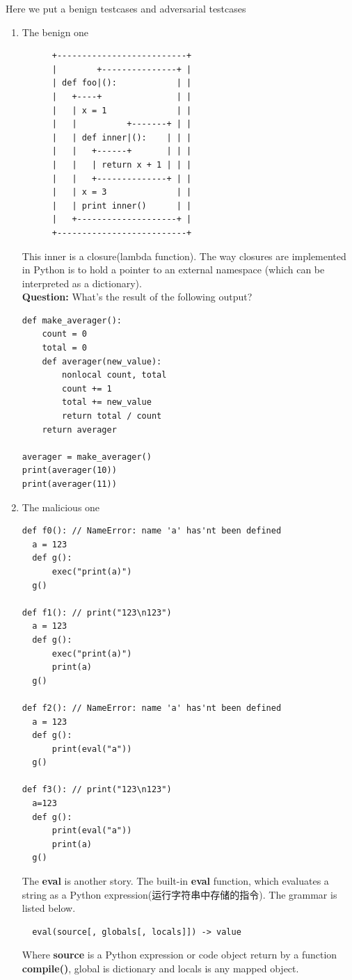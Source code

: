 \documentclass[a4paper]{exam}
\begin{document}
Here we put a benign testcases and adversarial testcases
\begin{enumerate}
  \item  The benign one
        \begin{verbatim}
      +--------------------------+
      |        +---------------+ |
      | def foo|():            | |
      |   +----+               | |
      |   | x = 1              | |
      |   |          +-------+ | |
      |   | def inner|():    | | |
      |   |   +------+       | | |
      |   |   | return x + 1 | | |
      |   |   +--------------+ | |
      |   | x = 3              | |
      |   | print inner()      | |
      |   +--------------------+ |
      +--------------------------+
\end{verbatim}

        This inner is a closure(lambda function). The way closures are implemented in Python is to hold a pointer to an external namespace (which can be interpreted as a dictionary).
        \\
        \textbf{Question:} What's the result of the following output?
        \begin{verbatim}
def make_averager():
    count = 0
    total = 0
    def averager(new_value):
        nonlocal count, total
        count += 1
        total += new_value
        return total / count
    return averager

averager = make_averager()
print(averager(10))
print(averager(11))
\end{verbatim}
        \begin{solution}

        \end{solution}
  \item The malicious one
        \begin{verbatim}
def f0(): // NameError: name 'a' has'nt been defined
  a = 123
  def g():
      exec("print(a)")
  g()

def f1(): // print("123\n123")
  a = 123
  def g():
      exec("print(a)")
      print(a)
  g()

def f2(): // NameError: name 'a' has'nt been defined
  a = 123
  def g():
      print(eval("a"))
  g()

def f3(): // print("123\n123")
  a=123
  def g():
      print(eval("a"))
      print(a)
  g()
\end{verbatim}
        The \textbf{eval} is another story. The built-in \textbf{eval} function, which evaluates a string as a Python expression(运行字符串中存储的指令). The grammar is listed below.
        \begin{verbatim}
  eval(source[, globals[, locals]]) -> value
\end{verbatim}
        Where \textbf{source} is a Python expression or code object return by a function \textbf{compile()}, global is dictionary and locals is any mapped object.

\end{enumerate}
\end{document}
